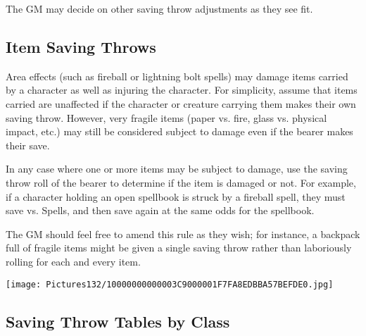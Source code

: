 \documentclass[a4paper,twoside,openany,10pt]{book}
\begin{document}
\begin{multicols}{2}
The GM may decide on other saving throw adjustments as they see fit.

\subsection{Item Saving Throws}\label{item-saving-throws}

Area effects (such as fireball or lightning bolt spells) may damage items carried by a character as well as injuring the character. For simplicity, assume that items carried are unaffected if the character or creature carrying them makes their own saving throw. However, very fragile items (paper vs. fire, glass vs. physical impact, etc.) may still be considered subject to damage even if the bearer makes their save.

In any case where one or more items may be subject to damage, use the saving throw roll of the bearer to determine if the item is damaged or not. For example, if a character holding an open spellbook is struck by a fireball spell, they must save vs. Spells, and then save again at the same odds for the spellbook.

The GM should feel free to amend this rule as they wish; for instance, a backpack full of fragile items might be given a single saving throw rather than laboriously rolling for each and every item.

\end{multicols}

\vfill

\begin{center}
	\texttt{[image: Pictures132/10000000000003C9000001F7FA8EDBBA57BEFDE0.jpg]}
\end{center}

\pagebreak


\subsection{Saving Throw Tables by Class}\label{saving-throw-tables-by-class}
\end{document}
